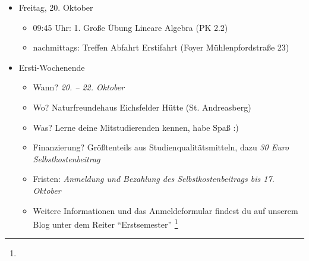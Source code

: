 \begin{itemize}
	\item Freitag, 20. Oktober
	\begin{itemize}
		\item 09:45 Uhr: 1. Große Übung Lineare Algebra (PK 2.2)
        \item nachmittags: Treffen Abfahrt Erstifahrt (Foyer Mühlenpfordstraße 23)
	\end{itemize}
	\item Ersti-Wochenende
	\begin{itemize}
		\item Wann? \emph{20. – 22. Oktober}
		\item Wo? Naturfreundehaus Eichsfelder Hütte (St. Andreasberg)
		\item Was? Lerne deine Mitstudierenden kennen, habe Spaß :)
		\item Finanzierung? Größtenteils aus Studienqualitätsmitteln, dazu \emph{30 Euro Selbstkostenbeitrag}
		\item Fristen: \emph{Anmeldung und Bezahlung des Selbstkostenbeitrags bis 17. Oktober}
		\item Weitere Informationen und das Anmeldeformular findest du auf unserem Blog unter dem Reiter \enquote{Erstsemester} \footnote{}
	\end{itemize}
\end{itemize}